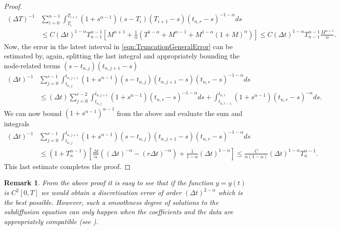 \documentclass[12pt,a4paper]{article}
\newtheorem{rem}{Remark}
\begin{document}
\begin{proof}
\begin{equation}
		\begin{split}
			(\Delta T)^{-1}&\sum_{i=0}^{n-1} \int_{T_i}^{T_{i+1}} (1+s^{\alpha-1})(s-T_i)(T_{i+1}-s)(t_{n,r}-s)^{-1-\alpha} ds \\
			&\leq C (\Delta t)^{1-\alpha}T_{n-1}^{\alpha-1}\left[M^{\alpha+1} + \frac{1}{\alpha}\left(T^{1-\alpha}+M^{\alpha-1} + M^{1-\alpha} (1+M)^\alpha\right)\right] \leq C (\Delta t)^{1-\alpha}T_{n-1}^{\alpha-1} \frac{M^{\alpha+1}}{\alpha}.
		\end{split}
	\end{equation}
	Now, the error in the latest interval in \eqref{eqn:TruncationGeneralError} can be estimated by, again, splitting the last integral and appropriately bounding the node-related terms $(s-t_{n,j})(t_{n,j+1}-s)$
	\begin{equation}
		\begin{split}
			(\Delta t)^{-1}&\sum_{j=0}^{r-1} \int_{t_{n,j}}^{t_{n,j+1}} (1+s^{\alpha-1})(s-t_{n,j})(t_{n,j+1}-s)(t_{n,r}-s)^{-1-\alpha} ds \\
			&\leq (\Delta t) \sum_{j=0}^{r-2} \int_{t_{n,j}}^{t_{n,j+1}}(1+s^{\alpha-1})(t_{n,r}-s)^{-1-\alpha} ds + \int_{t_{n,r-1}}^{t_{n,r}} (1+s^{\alpha-1})(t_{n,r}-s)^{-\alpha}ds.
		\end{split}
	\end{equation}
	We can now bound $(1+s^{\alpha-1})^{\alpha-1}$ from the above and evaluate the sum and integrals
	\begin{equation}
		\begin{split}
			(\Delta t)^{-1}&\sum_{j=0}^{r-1} \int_{t_{n,j}}^{t_{n,j+1}} (1+s^{\alpha-1})(s-t_{n,j})(t_{n,j+1}-s)(t_{n,r}-s)^{-1-\alpha} ds \\
			&\leq (1+T_n^{\alpha-1}) \left[\frac{\Delta t}{\alpha} \left((\Delta t)^{-\alpha} - (r\Delta t)^{-\alpha}\right) + \frac{1}{1-\alpha} (\Delta t)^{1-\alpha}\right] \leq \frac{C}{\alpha(1-\alpha)} (\Delta t)^{1-\alpha} T_n^{\alpha-1}.
		\end{split}
	\end{equation}
	This last estimate completes the proof. 
\end{proof}

\begin{rem}\label{rem:Regularity}
	From the above proof it is easy to see that if the function $y=y(t)$ is $C^2[0,T]$ we would obtain a discretisation error of order $(\Delta t)^{2-\alpha}$ which is the best possible. However, such a smoothness degree of solutions to the subdiffusion equation can only happen when the coefficients and the data are appropriately compatible (see \cite{Sak11, Sty16}).  
\end{rem}
\end{document}
